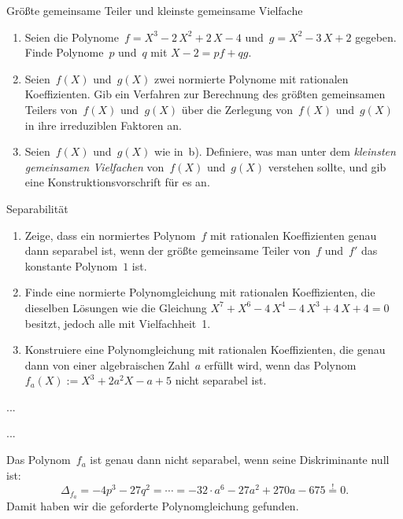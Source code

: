 \documentclass{algblatt}
\begin{document}
\vspace*{-1.5cm}

\begin{aufgabe}{Größte gemeinsame Teiler und kleinste gemeinsame Vielfache}
\begin{enumerate}
\item Seien die Polynome~$f = X^3 - 2\,X^2 + 2\,X - 4$
und~$g = X^2 - 3\,X + 2$ gegeben. Finde Polynome~$p$ und~$q$ mit
$X-2 = p f + q g$.
\item Seien~$f(X)$ und~$g(X)$ zwei normierte Polynome mit rationalen
Koeffizienten. Gib ein Verfahren zur Berechnung des größten gemeinsamen Teilers
von~$f(X)$ und~$g(X)$ über die Zerlegung von~$f(X)$ und~$g(X)$ in ihre
irreduziblen Faktoren an.
\item Seien~$f(X)$ und~$g(X)$ wie in~b). Definiere, was man unter dem
\emph{kleinsten gemeinsamen Vielfachen} von~$f(X)$ und~$g(X)$ verstehen sollte,
und gib eine Konstruktionsvorschrift für es an.
\end{enumerate}
\end{aufgabe}

\begin{aufgabe}{Separabilität}
\begin{enumerate}
\item Zeige, dass ein normiertes Polynom~$f$ mit rationalen Koeffizienten genau
dann separabel ist, 
wenn der größte gemeinsame Teiler von~$f$
und~$f'$ das konstante Polynom~$1$ ist.
\item Finde eine normierte Polynomgleichung mit rationalen
Koeffizienten, die dieselben Lösungen wie die
Gleichung $X^7+X^6-4\,X^4-4\,X^3+4\,X+4=0$ besitzt, jedoch alle mit
Vielfachheit~1.
\item Konstruiere eine Polynomgleichung mit rationalen Koeffizienten, die genau dann
von einer algebraischen Zahl~$a$ erfüllt wird, wenn das Polynom~$f_a(X) := X^3
+ 2a^2 X - a + 5$ nicht separabel ist.
\end{enumerate}

\begin{loesungE}
\item ...
\item ...
\item Das Polynom~$f_a$ ist genau dann nicht separabel, wenn seine Diskriminante null
ist:
\[ \Delta_{f_a} = -4p^3 - 27q^2 = \cdots =
  -32 \cdot a^6 - 27 a^2 + 270 a - 675 \stackrel{!}{=} 0. \]
Damit haben wir die geforderte Polynomgleichung gefunden.
\end{loesungE}
\end{aufgabe}
\end{document}
